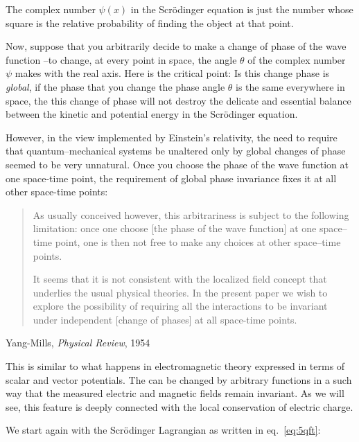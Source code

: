 The complex number $\psi(x)$ in the Scrödinger equation is just the number whose square is the relative probability of finding the object at that point.

Now, suppose that you arbitrarily decide to make a change of phase of the wave function --to change, at every point in space, the angle $\theta$ of the complex number $\psi$ makes with the real axis. Here is the critical point: Is this change phase is \emph{global}, if the phase that you change the phase angle $\theta$ is the same everywhere in space, the this change of phase will not destroy the delicate and essential balance between the kinetic and potential energy in the Scrödinger equation.

However, in the view implemented by Einstein's relativity, the need to require that quantum--mechanical systems be unaltered only by global changes of phase seemed to be very unnatural. Once you choose the phase of the wave function at one space-time point, the requirement of global phase invariance fixes it at all other space-time points:


  \begin{quote}
\small
    As usually conceived however, this arbitrariness is subject to the following  limitation: once one choose [the phase of the wave function] at one space--time point, one is then not free to make any choices at other space--time points.

It seems that it is not consistent with the localized field concept that underlies the usual physical theories. In the present paper we wish to explore the possibility of requiring all the interactions to be invariant under independent [change of phases] at all space-time points.
  \end{quote}
  \begin{flushright}
    Yang-Mills, \emph{Physical Review}, 1954
  \end{flushright}

This is similar to what happens in electromagnetic theory expressed in terms of scalar and vector potentials. The can be changed by arbitrary functions in a such way that the measured electric and magnetic fields remain invariant. As we will see, this feature is deeply connected with the local conservation of electric charge. 

We start again with the Scrödinger Lagrangian as written in eq.~\eqref{eq:5qft}:

